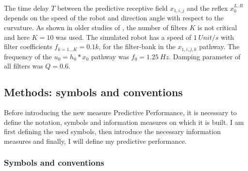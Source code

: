 The time delay $T$ between the predictive receptive field $x_{1,i,j}$ and 
the reflex $x_0^{L,R}$ depends on the
speed of the robot and direction angle with respect to the
curvature. As shown in older studies of
\cite{Porr03a,Porr06}, the number of filters $K$ is not critical and
here $K=10$ was used. The simulated robot has a speed of $1~Unit/s$
with filter coefficients $f_{k=1\ldots K}=0.1 k$, for the
filter-bank in the $x_{1,i,j,k}$ pathway. The frequency of the $u_0 = h_0 * x_0$ 
pathway was
$f_0=1.25~Hz$. Damping parameter of all filters was $Q=0.6$.



\subsection{Methods: symbols and conventions}

Before introducing the new measure Predictive Performance, it is necessary to
define the notation, symbols and information measures on which it is built. I am
first defining the used symbols, then introduce the necessary
information measures and finally, I will define my predictive performance.


\subsubsection{Symbols and conventions}

